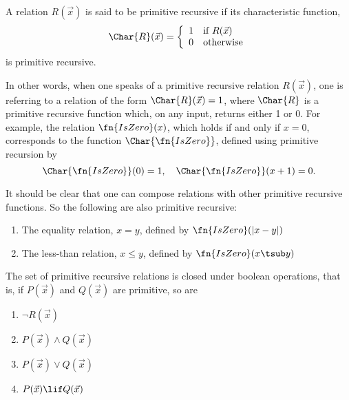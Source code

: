 \documentclass[../../../include/open-logic-section]{subfiles}
\begin{document}


\begin{defn}
A relation $R(\vec x)$ is said to be primitive recursive if its characteristic
function,
\[
\Char{R}(\vec x) = \left\{
  \begin{array}{ll}
  1 & \mbox{if $R(\vec x)$} \\
  0 & \mbox{otherwise}
  \end{array}
\right.
\]
is primitive recursive.
\end{defn}

In other words, when one speaks of a primitive recursive relation
$R(\vec x)$, one is referring to a relation of the form $\Char{R}(\vec
x) = 1$, where $\Char{R}$ is a primitive recursive function which, on
any input, returns either 1 or 0. For example, the relation
$\fn{IsZero}(x)$, which holds if and only if $x = 0$, corresponds to the
function $\Char{\fn{IsZero}}$, defined using primitive recursion by
\[
\Char{\fn{IsZero}}(0) = 1, \quad \Char{\fn{IsZero}}(x+1) = 0.
\]

It should be clear that one can compose relations with other primitive
recursive functions. So the following are also primitive recursive:
\begin{enumerate}
\item The equality relation, $x = y$, defined by $\fn{IsZero}(\left|x -
  y\right|)$
\item The less-than relation, $x \leq y$, defined by $\fn{IsZero}(x
  \tsub y)$
\end{enumerate}


\begin{prop}
  The set of primitive recursive relations is closed under boolean
  operations, that is, 
  if $P(\vec x)$ and $Q(\vec x)$ are primitive, so are
  \begin{enumerate}
  \item $\lnot R(\vec x)$
  \item $P(\vec x) \land Q(\vec x)$
  \item $P(\vec x) \lor Q(\vec x)$
  \item $P(\vec x) \lif Q(\vec x)$
  \end{enumerate}
\end{prop}
\end{document}
